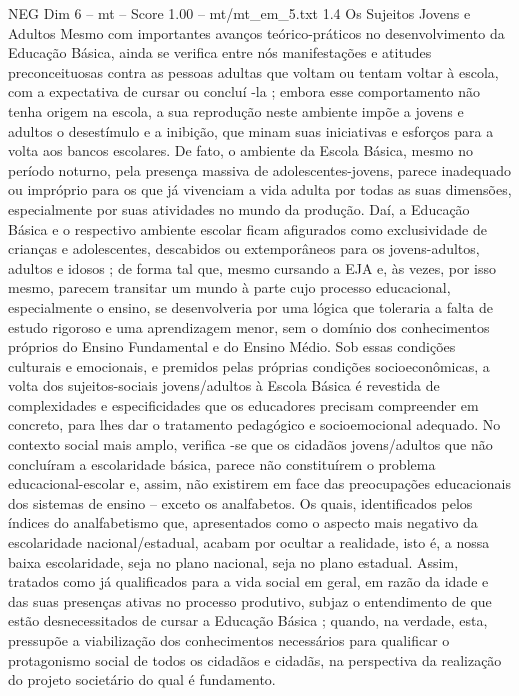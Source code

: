 \begin{textsample}{NEG Dim 6 – mt – Score 1.00 – mt/mt\_em\_5.txt}  \label{ex:f6_neg_130}
1.4 Os Sujeitos Jovens e Adultos Mesmo com importantes avanços teórico-práticos no desenvolvimento da Educação Básica, ainda se verifica entre nós manifestações e atitudes preconceituosas contra as pessoas adultas que voltam ou tentam voltar à escola, com a expectativa de cursar ou concluí -la ; embora esse comportamento não tenha origem na escola, a sua reprodução neste ambiente impõe a jovens e adultos o desestímulo e a inibição, que minam suas iniciativas e esforços para a volta aos bancos escolares.
De fato, o ambiente da Escola Básica, mesmo no período noturno, pela presença massiva de adolescentes-jovens, parece inadequado ou impróprio para os que já vivenciam a vida adulta por todas as suas dimensões, especialmente por suas atividades no mundo da produção.
Daí, a Educação Básica e o respectivo ambiente escolar ficam afigurados como exclusividade de crianças e adolescentes, descabidos ou extemporâneos para os jovens-adultos, adultos e idosos ; de forma tal que, mesmo cursando a EJA e, às vezes, por isso mesmo, parecem transitar um mundo à parte cujo processo educacional, especialmente o ensino, se desenvolveria por uma lógica que toleraria a falta de estudo rigoroso e uma aprendizagem menor, sem o domínio dos conhecimentos próprios do Ensino Fundamental e do Ensino Médio.
Sob essas condições culturais e emocionais, e premidos pelas próprias condições socioeconômicas, a volta dos sujeitos-sociais jovens/adultos à Escola Básica é revestida de complexidades e especificidades que os educadores precisam compreender em concreto, para lhes dar o tratamento pedagógico e socioemocional adequado.
No contexto social mais amplo, verifica -se que os cidadãos jovens/adultos que não concluíram a escolaridade básica, parece não constituírem o problema educacional-escolar e, assim, não existirem em face das preocupações educacionais dos sistemas de ensino – exceto os analfabetos.
Os quais, identificados pelos índices do analfabetismo que, apresentados como o aspecto mais negativo da escolaridade nacional/estadual, acabam por ocultar a realidade, isto é, a nossa baixa escolaridade, seja no plano nacional, seja no plano estadual.
Assim, tratados como já qualificados para a vida social em geral, em razão da idade e das suas presenças ativas no processo produtivo, subjaz o entendimento de que estão desnecessitados de cursar a Educação Básica ; quando, na verdade, esta, pressupõe a viabilização dos conhecimentos necessários para qualificar o protagonismo social de todos os cidadãos e cidadãs, na perspectiva da realização do projeto societário do qual é fundamento.

\end{textsample}
